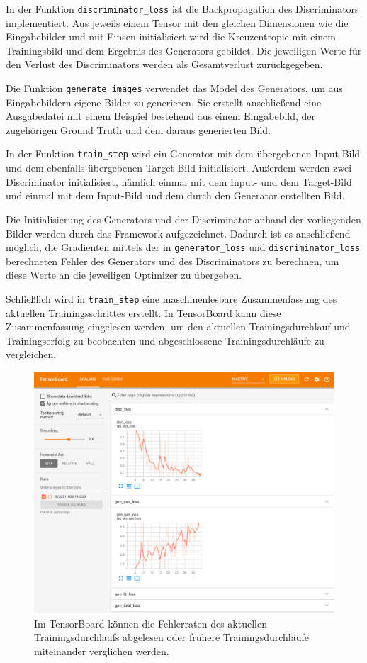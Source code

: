In der Funktion \lstinline|discriminator_loss| ist die Backpropagation des Discriminators implementiert. Aus jeweils einem Tensor mit den gleichen Dimensionen wie die Eingabebilder und mit Einsen initialisiert wird die Kreuzentropie mit einem Trainingsbild und dem Ergebnis des Generators gebildet. Die jeweiligen Werte für den Verlust des Discriminators werden als Gesamtverlust zurückgegeben.

Die Funktion \lstinline|generate_images| verwendet das Model des Generators, um aus Eingabebildern eigene Bilder zu generieren. Sie erstellt anschließend eine Ausgabedatei mit einem Beispiel bestehend aus einem Eingabebild, der zugehörigen Ground Truth und dem daraus generierten Bild.

In der Funktion \lstinline|train_step| wird ein Generator mit dem übergebenen Input-Bild und dem ebenfalls übergebenen Target-Bild initialisiert. Außerdem werden zwei Discriminator initialisiert, nämlich einmal mit dem Input- und dem Target-Bild und einmal mit dem Input-Bild und dem durch den Generator erstellten Bild.

Die Initialisierung des Generators und der Discriminator anhand der vorliegenden Bilder werden durch das Framework aufgezeichnet. Dadurch ist es anschließend möglich, die Gradienten mittels der in \lstinline|generator_loss| und \lstinline|discriminator_loss| berechneten Fehler des Generators und des Discriminators zu berechnen, um diese Werte an die jeweiligen Optimizer zu übergeben.

Schließlich wird in \lstinline|train_step| eine maschinenlesbare Zusammenfassung des aktuellen Trainingsschrittes erstellt. In TensorBoard kann diese Zusammenfassung eingelesen werden, um den aktuellen Trainingsdurchlauf und Trainingserfolg zu beobachten und abgeschlossene Trainingsdurchläufe zu vergleichen.

\begin{figure}[h]
	\centering
	\includegraphics[width=1.0\textwidth]{bilder/tensorboard.png}
	\caption[TensorBoard]{Im TensorBoard können die Fehlerraten des aktuellen Trainingsdurchlaufs abgelesen oder frühere Trainingsdurchläufe miteinander verglichen werden.}
	\label{fig:tensorboard}
\end{figure}


